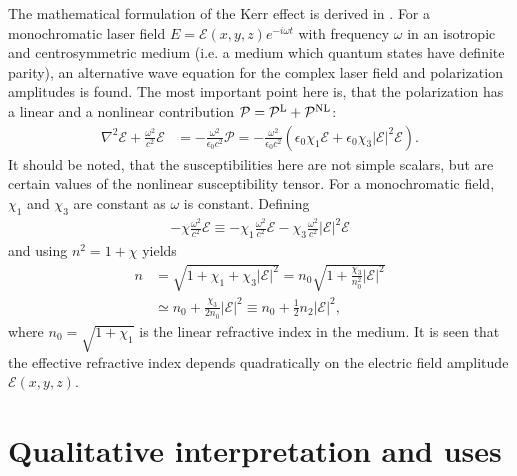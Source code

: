 The mathematical formulation of the Kerr effect is derived in
\textcite[sec.~10.3]{milonni}. For a monochromatic laser field $E =
\mathcal{E}(x,y,z) e^{-i \omega t}$ with frequency $\omega$ in an isotropic
and centrosymmetric medium (i.e. a medium which quantum states have
definite parity), an alternative wave equation for the complex laser
field and polarization amplitudes is found. The most important point
here is, that the polarization has a linear and a nonlinear
contribution $\mathcal{P} = \mathcal{P}^{\textup L} +
\mathcal{P}^{\textup{NL}}$:
\begin{align}
  \label{eq:kerr-wave-eqn}
  \nabla^2 \mathcal{E} + \frac{\omega^2}{c^2} \mathcal{E}
  &= - \frac{\omega^2}{\epsilon_0 c^2} \mathcal{P}
  = - \frac{\omega^2}{\epsilon_0 c^2} \left( \epsilon_0 \chi_1
    \mathcal{E} + \epsilon_0 \chi_3 |\mathcal{E}|^2 \mathcal{E}
  \right).
\end{align}
It should be noted, that the susceptibilities here are not simple
scalars, but are certain values of the nonlinear susceptibility
tensor. For a monochromatic field, $\chi_1$ and $\chi_3$ are constant
as $\omega$ is constant. Defining %
\begin{align}
  - \chi \frac{\omega^2}{c^2} \mathcal{E}
  \equiv - \chi_1 \frac{\omega^2}{c^2} \mathcal{E}
  - \chi_3 \frac{\omega^2}{c^2} |\mathcal{E}|^2 \mathcal{E}
\end{align}
and using $n^2 = 1 + \chi$ yields
\begin{align}
  n &= \sqrt{1 + \chi_1 + \chi_3 |\mathcal{E}|^2}
  = n_0 \sqrt{1 + \frac{\chi_3}{n_0^2} |\mathcal{E}|^2}
  \\
  &\simeq n_0 + \frac{\chi_3}{2n_0} |\mathcal{E}|^2
  \label{eq:kerr-n-chi}
  \equiv n_0 + \tfrac{1}{2} n_2 |\mathcal{E}|^2,
\end{align}
where $n_0 = \sqrt{1 + \chi_1}$ is the linear refractive index in the
medium.
It is seen that the effective refractive index
depends quadratically on the electric field amplitude $\mathcal{E}(x,y,z)$.


\section{Qualitative interpretation and uses}
\label{sec:kerr-interpr}

